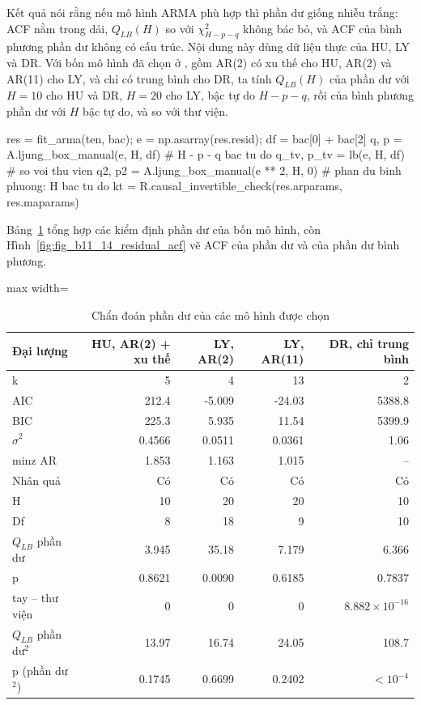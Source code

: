  Kết quả  nói rằng nếu mô hình ARMA phù hợp thì phần dư giống nhiễu trắng: ACF nằm trong dải, $Q_{LB}(H)$ so với $\chi^2_{H-p-q}$ không bác bỏ, và ACF của bình phương phần dư không có cấu trúc.
 Nội dung này dùng dữ liệu thực của HU, LY và DR. Với bốn mô hình đã chọn ở , gồm AR(2) có xu thế cho HU, AR(2) và AR(11) cho LY, và chỉ có trung bình cho DR, ta tính $Q_{LB}(H)$ của phần dư với $H=10$ cho HU và DR, $H=20$ cho LY, bậc tự do $H-p-q$, rồi của bình phương phần dư với $H$ bậc tự do, và so với thư viện.
\begin{codeblock}
res = fit_arma(ten, bac); e = np.asarray(res.resid); df = bac[0] + bac[2]
q, p = A.ljung_box_manual(e, H, df)              # H - p - q bac tu do
q_tv, p_tv = lb(e, H, df)                         # so voi thu vien
q2, p2 = A.ljung_box_manual(e ** 2, H, 0)         # phan du binh phuong: H bac tu do
kt = R.causal_invertible_check(res.arparams, res.maparams)
\end{codeblock}
 Bảng~\ref{tab:tab_b11_14_residual_diagnostics} tổng hợp các kiểm định phần dư của bốn mô hình, còn Hình~\ref{fig:fig_b11_14_residual_acf} vẽ ACF của phần dư và của phần dư bình phương.
\begin{table}[H]
\centering\footnotesize
\caption{Chẩn đoán phần dư của các mô hình được chọn}\label{tab:tab_b11_14_residual_diagnostics}
\begin{adjustbox}{max width=\linewidth}
\begin{tabular}{|l|r|r|r|r|}
\toprule
Đại lượng & HU, AR(2) + xu thế & LY, AR(2) & LY, AR(11) & DR, chỉ trung bình \\
\midrule
k & 5 & 4 & 13 & 2 \\
AIC & 212.4 & -5.009 & -24.03 & 5388.8 \\
BIC & 225.3 & 5.935 & 11.54 & 5399.9 \\
$\hat{\sigma}^{2}$ & 0.4566 & 0.0511 & 0.0361 & 1.06 \\
min\textbar{}z\textbar{} AR & 1.853 & 1.163 & 1.015 & – \\
Nhân quả & Có & Có & Có & Có \\
H & 10 & 20 & 20 & 10 \\
Df & 8 & 18 & 9 & 10 \\
$Q_{LB}$ phần dư & 3.945 & 35.18 & 7.179 & 6.366 \\
p & 0.8621 & 0.0090 & 0.6185 & 0.7837 \\
\textbar{}tay – thư viện\textbar{} & 0 & 0 & 0 & $8.882\times10^{-16}$ \\
$Q_{LB}$ phần dư$^{2}$ & 13.97 & 16.74 & 24.05 & 108.7 \\
p (phần dư$^{2}$) & 0.1745 & 0.6699 & 0.2402 & $<10^{-4}$ \\
\bottomrule
\end{tabular}
\end{adjustbox}\par{}
\end{table}
